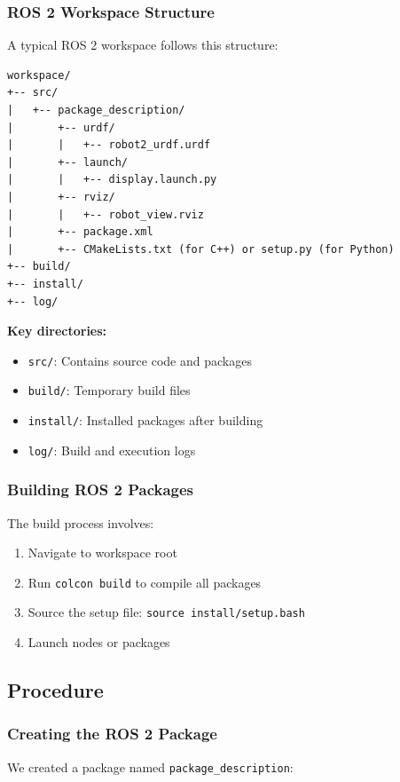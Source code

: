 \subsubsection{ROS 2 Workspace Structure}

A typical ROS 2 workspace follows this structure:

\begin{verbatim}
workspace/
+-- src/
|   +-- package_description/
|       +-- urdf/
|       |   +-- robot2_urdf.urdf
|       +-- launch/
|       |   +-- display.launch.py
|       +-- rviz/
|       |   +-- robot_view.rviz
|       +-- package.xml
|       +-- CMakeLists.txt (for C++) or setup.py (for Python)
+-- build/
+-- install/
+-- log/
\end{verbatim}

\textbf{Key directories:}
\begin{itemize}
	\item \texttt{src/}: Contains source code and packages
	\item \texttt{build/}: Temporary build files
	\item \texttt{install/}: Installed packages after building
	\item \texttt{log/}: Build and execution logs
\end{itemize}

\subsubsection{Building ROS 2 Packages}

The build process involves:
\begin{enumerate}
	\item Navigate to workspace root
	\item Run \texttt{colcon build} to compile all packages
	\item Source the setup file: \texttt{source install/setup.bash}
	\item Launch nodes or packages
\end{enumerate}

\subsection{Procedure}

\subsubsection{Creating the ROS 2 Package}

We created a package named \texttt{package\_description}:

